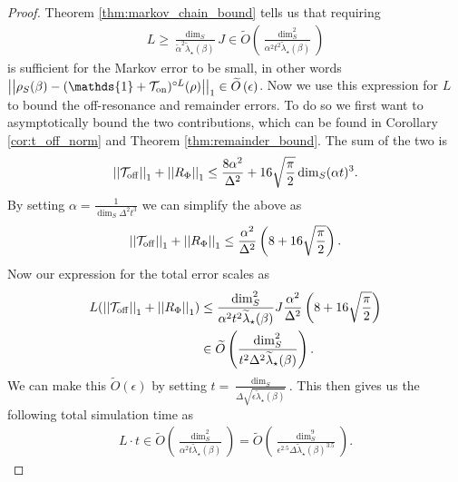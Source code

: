 \documentclass{article}
\newcommand{\on}{\rm on}
\newcommand{\off}{\rm off}
\newcommand{\norm}[1]{\left|\left| #1 \right|\right|}
\newcommand{\TT}{\mathcal{T}}
\newcommand{\bigotilde}[1]{\widetilde{O} \left( #1 \right)}
\newcommand{\identity}{\mathds{1}}
\begin{document}
\begin{proof}
    Theorem \ref{thm:markov_chain_bound} tells us that requiring 
    \begin{align}
        L \ge \frac{\dim_S}{\widetilde{\alpha}^2 \widetilde{\lambda}_\star(\beta)} J \in \bigotilde{\frac{\dim_S^2}{\alpha^2 t^2 \widetilde{\lambda}_\star(\beta)}}
    \end{align}
    is sufficient for the Markov error to be small, in other words $\norm{\rho_S(\beta) - (\identity + \TT_{\on})^{\circ L}(\rho)}_1 \in \bigotilde{\epsilon}$. Now we use this expression for $L$ to bound the off-resonance and remainder errors. To do so we first want to asymptotically bound the two contributions, which can be found in Corollary \ref{cor:t_off_norm} and Theorem \ref{thm:remainder_bound}. The sum of the two is
    \begin{equation}
        \norm{\TT_{\off}}_1 + \norm{R_{\Phi}}_1 \le \frac{8 \alpha^2}{\Delta^2} + 16 \sqrt{\frac{\pi}{2}} \dim_S (\alpha t)^3.
    \end{equation}
    By setting $\alpha = \frac{1}{\dim_S \Delta^2 t^3}$ we can simplify the above as
    \begin{equation}
        \norm{\TT_{\off}}_1 + \norm{R_{\Phi}}_1 \le \frac{\alpha^2}{\Delta^2} \left(8 + 16 \sqrt{\frac{\pi}{2}} \right).
    \end{equation}
    Now our expression for the total error scales as
    \begin{align}
        L (\norm{\TT_{\off}}_1 + \norm{R_{\Phi}}_1) &\le \frac{\dim_S^2}{\alpha^2 t^2 \widetilde{\lambda}_\star(\beta)} J \frac{\alpha^2}{\Delta^2} \left(8 + 16 \sqrt{\frac{\pi}{2}} \right) \\
        &\in \bigotilde{\frac{\dim_S^2}{t^2 \Delta^2 \widetilde{\lambda}_\star(\beta)}}.
    \end{align}
    We can make this $\bigotilde{\epsilon}$ by setting $t = \frac{\dim_S}{\Delta \sqrt{\epsilon \widetilde{\lambda}_\star(\beta)}}$.
    This then gives us the following total simulation time as
    \begin{align}
        L\cdot t \in \bigotilde{\frac{\dim_S^2}{\alpha^2 t \widetilde{\lambda}_\star(\beta)} } = \bigotilde{\frac{\dim_S^9}{\epsilon^{2.5} \Delta  \widetilde{\lambda}_\star(\beta)^{3.5}}}.
    \end{align}
    

\end{proof}
\end{document}
